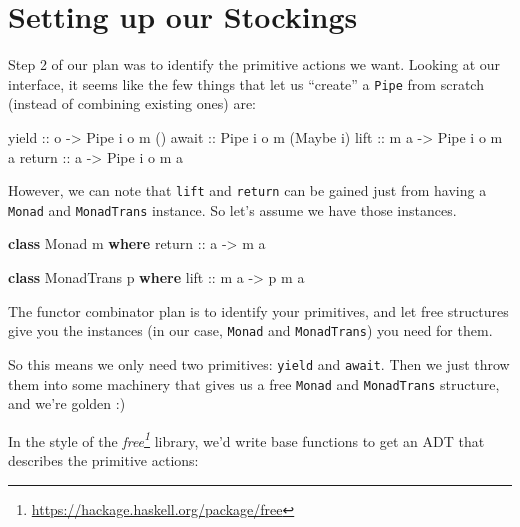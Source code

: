 \documentclass[]{article}
\newenvironment{Shaded}{}{}
\newcommand{\DataTypeTok}[1]{\textcolor[rgb]{0.56,0.13,0.00}{#1}}
\newcommand{\FunctionTok}[1]{\textcolor[rgb]{0.02,0.16,0.49}{#1}}
\newcommand{\KeywordTok}[1]{\textcolor[rgb]{0.00,0.44,0.13}{\textbf{#1}}}
\newcommand{\NormalTok}[1]{#1}
\newcommand{\OtherTok}[1]{\textcolor[rgb]{0.00,0.44,0.13}{#1}}
\renewcommand{\href}[2]{#2\footnote{\url{#1}}}
\begin{document}
\section{Setting up our Stockings}\label{setting-up-our-stockings}

Step 2 of our plan was to identify the primitive actions we want. Looking at our
interface, it seems like the few things that let us ``create'' a \texttt{Pipe}
from scratch (instead of combining existing ones) are:

\begin{Shaded}
\begin{Highlighting}[]
\OtherTok{yield  ::}\NormalTok{ o }\OtherTok{{-}\textgreater{}} \DataTypeTok{Pipe}\NormalTok{ i o m ()}
\OtherTok{await  ::} \DataTypeTok{Pipe}\NormalTok{ i o m (}\DataTypeTok{Maybe}\NormalTok{ i)}
\OtherTok{lift   ::}\NormalTok{ m a }\OtherTok{{-}\textgreater{}} \DataTypeTok{Pipe}\NormalTok{ i o m a}
\FunctionTok{return}\OtherTok{ ::}\NormalTok{ a   }\OtherTok{{-}\textgreater{}} \DataTypeTok{Pipe}\NormalTok{ i o m a}
\end{Highlighting}
\end{Shaded}

However, we can note that \texttt{lift} and \texttt{return} can be gained just
from having a \texttt{Monad} and \texttt{MonadTrans} instance. So let's assume
we have those instances.

\begin{Shaded}
\begin{Highlighting}[]
\KeywordTok{class} \DataTypeTok{Monad}\NormalTok{ m }\KeywordTok{where}
\OtherTok{    return ::}\NormalTok{ a }\OtherTok{{-}\textgreater{}}\NormalTok{ m a}

\KeywordTok{class} \DataTypeTok{MonadTrans}\NormalTok{ p }\KeywordTok{where}
\OtherTok{    lift ::}\NormalTok{ m a }\OtherTok{{-}\textgreater{}}\NormalTok{ p m a}
\end{Highlighting}
\end{Shaded}

The functor combinator plan is to identify your primitives, and let free
structures give you the instances (in our case, \texttt{Monad} and
\texttt{MonadTrans}) you need for them.

So this means we only need two primitives: \texttt{yield} and \texttt{await}.
Then we just throw them into some machinery that gives us a free \texttt{Monad}
and \texttt{MonadTrans} structure, and we're golden :)

In the style of the \emph{\href{https://hackage.haskell.org/package/free}{free}}
library, we'd write base functions to get an ADT that describes the primitive
actions:
\end{document}
